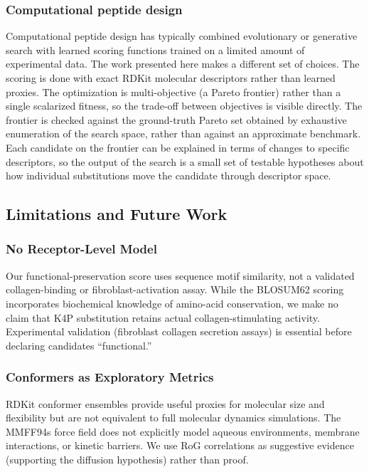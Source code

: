 \documentclass[11pt,letterpaper]{article}
\begin{document}
\subsubsection{Computational peptide design}

Computational peptide design has typically combined evolutionary or generative search with learned scoring functions trained on a limited amount of experimental data. The work presented here makes a different set of choices. The scoring is done with exact RDKit molecular descriptors rather than learned proxies. The optimization is multi-objective (a Pareto frontier) rather than a single scalarized fitness, so the trade-off between objectives is visible directly. The frontier is checked against the ground-truth Pareto set obtained by exhaustive enumeration of the search space, rather than against an approximate benchmark. Each candidate on the frontier can be explained in terms of changes to specific descriptors, so the output of the search is a small set of testable hypotheses about how individual substitutions move the candidate through descriptor space.

\subsection{Limitations and Future Work}

\subsubsection{No Receptor-Level Model}

Our functional-preservation score uses sequence motif similarity, not a validated collagen-binding or fibroblast-activation assay. While the BLOSUM62 scoring incorporates biochemical knowledge of amino-acid conservation, we make no claim that K4P substitution retains actual collagen-stimulating activity. Experimental validation (fibroblast collagen secretion assays) is essential before declaring candidates ``functional.''

\subsubsection{Conformers as Exploratory Metrics}

RDKit conformer ensembles provide useful proxies for molecular size and flexibility but are not equivalent to full molecular dynamics simulations. The MMFF94s force field does not explicitly model aqueous environments, membrane interactions, or kinetic barriers. We use RoG correlations as suggestive evidence (supporting the diffusion hypothesis) rather than proof.
\end{document}
